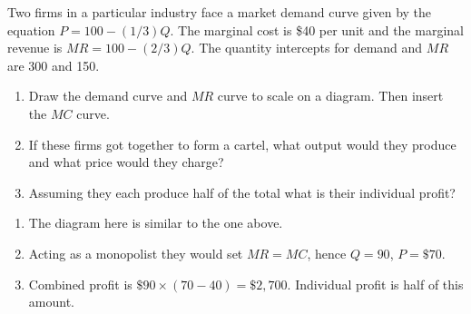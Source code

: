 \begin{enumialphparenastyle}
\begin{econex}\label{ex:ch11ex3}
Two firms in a particular industry face a market demand curve given by the equation $P=100-(1/3)Q$. The marginal cost is \$40 per unit and the marginal revenue is $MR=100-(2/3)Q$. The quantity intercepts for demand and $MR$ are 300 and 150.
\begin{enumerate}
\item	Draw the demand curve and $MR$ curve to scale on a diagram. Then insert the $MC$ curve.
\item	If these firms got together to form a cartel, what output would they produce and what price would they charge? 
\item	Assuming they each produce half of the total what is their individual profit?
\end{enumerate}
\begin{econsolution}
\begin{enumerate}
\item	The diagram here is similar to the one above.
\item	Acting as a monopolist they would set $MR=MC$, hence $Q=90$, $P=\$70$.
\item	Combined profit is $\$90\times(70-40)=\$2,700$. Individual profit is half of this amount.
\end{enumerate}
\end{econsolution}
\end{econex} 


\end{enumialphparenastyle}
